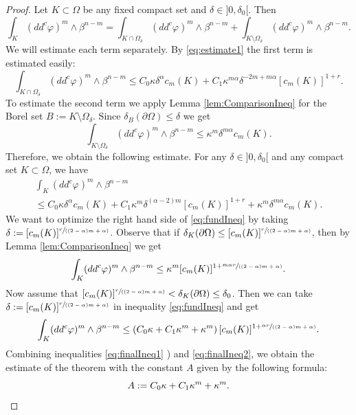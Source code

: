 \documentclass[11pt]{article}
\numberwithin{equation}{section}
\newcommand{\spfrac}[2]{\sfrac{#1}{(#2)}}
\theoremstyle{definition}
\theoremstyle{plain}
\theoremstyle{definition}
\begin{document}
\begin{proof}
Let $K \subset \Omega$ be any fixed compact set and $\delta\in{}]0,\delta_0[$. Then
\[
\int_K (dd^c\varphi)^m\wedge\beta^{n-m} = \int_{K \cap \Omega_\delta} (dd^c\varphi)^m\wedge\beta^{n-m} + \int_{K \setminus \Omega_\delta} (dd^c\varphi)^m\wedge\beta^{n-m}.
\]
We will estimate each term separately. By \eqref{eq:estimate1} the first term is estimated easily:
\[
\int_{K \cap \Omega_\delta} (dd^c\varphi)^m\wedge\beta^{n-m} \leq C_0 \kappa \delta^{\alpha} c_m (K) + C_1 \kappa^{m \alpha}\delta^{-2m + m \alpha} [c_m(K)]^{1+ r}.
\]
To estimate the second term we apply Lemma \ref{lem:ComparisonIneq} for the Borel set $ B:= K \setminus \Omega_\delta$. Since $\delta_B (\partial \Omega) \leq \delta$ we get
\[
\int_{K \setminus \Omega_\delta} (dd^c\varphi)^m\wedge\beta^{n-m} \leq \kappa^m \delta^{m \alpha} c_m (K).
\]
Therefore, we obtain the following estimate. For any $\delta\in{}]0,\delta_0[$ and any compact set $K \subset \Omega$, we have
\begin{multline} \label{eq:fundIneq}
\int_{K}(dd^c\varphi)^m\wedge\beta^{n-m}\\[-5pt]
\leq C_0 \kappa \delta^{\alpha} c_m (K) + C_1 \kappa^m \delta^{(\alpha -2) m } [c_m(K)]^{1+ r} + \kappa^m \delta^{m \alpha} c_m (K).
\end{multline}
We want to optimize the right hand side of \eqref{eq:fundIneq} by taking $\delta:= [c_m (K)]^{\spfrac{r}{(2-\alpha) m + \alpha}}$. Observe that if $ \delta_K(\partial \Omega) \leq [c_m (K)]^{\spfrac{r}{(2-\alpha) m + \alpha}}$, then by Lemma \ref{lem:ComparisonIneq} we get
\begin{equation} \label{eq:finalIneq1}
\int_{K}(dd^c\varphi)^m\wedge\beta^{n-m} \leq \kappa^m [c_m (K)]^{1 + \spfrac{m \alpha r}{(2-\alpha) m + \alpha}}.
\end{equation}
Now assume that $ [c_m (K)]^{\spfrac{r}{(2-\alpha) m + \alpha}} < \delta_K (\partial \Omega) \leq \delta_0$. Then we can take $\delta:= [c_m (K)]^{\spfrac{r}{(2-\alpha) m + \alpha}}$ in inequality \eqref{eq:fundIneq} and get
\begin{equation}\label{eq:finalIneq2}
\int_{K}(dd^c\varphi)^m\wedge\beta^{n-m} \leq (C_0 \kappa + C_1 \kappa^m + \kappa^m) \, [c_m (K)]^{1 + \spfrac{\alpha r}{(2-\alpha) m + \alpha}}.
\end{equation}
Combining inequalities \eqref{eq:finalIneq1} ) and \eqref{eq:finalIneq2}, we obtain the estimate of the theorem with the constant $A$ given by the following formula:
\begin{equation} \label{eq:finalConst}
A:= C_0 \kappa + C_1 \kappa^m + \kappa^m.\qedhere
\end{equation}
\end{proof}
\end{document}
